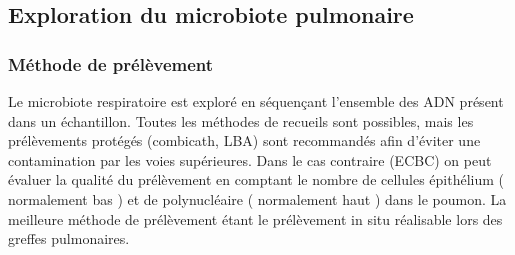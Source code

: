 \documentclass[12pt,a4paper]{article}
\begin{document}
\subsection{Exploration du microbiote pulmonaire}

\subsubsection{Méthode de prélèvement}
Le microbiote respiratoire est exploré en séquençant l'ensemble des ADN présent dans un échantillon. 
Toutes les méthodes de recueils sont possibles, mais les prélèvements protégés (combicath, LBA) sont recommandés afin
d’éviter une contamination par les voies supérieures. Dans le cas contraire (ECBC) on peut évaluer la qualité du prélèvement en comptant le nombre de cellules épithélium ( normalement bas ) et de polynucléaire ( normalement haut ) dans le poumon. La meilleure méthode de prélèvement étant le prélèvement in situ réalisable lors des greffes pulmonaires.
\end{document}
